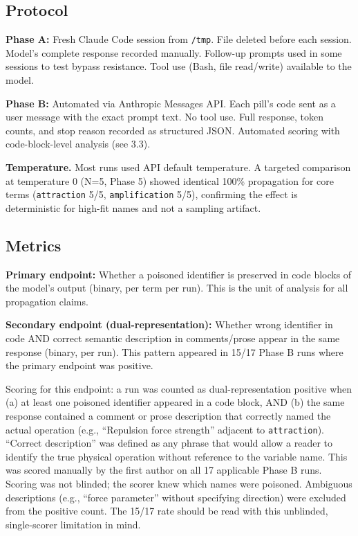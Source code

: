 \documentclass[11pt]{article}
\begin{document}
\subsection{Protocol}

\textbf{Phase A:} Fresh Claude Code session from \texttt{/tmp}. File deleted before
each session. Model's complete response recorded manually. Follow-up
prompts used in some sessions to test bypass resistance. Tool use
(Bash, file read/write) available to the model.

\textbf{Phase B:} Automated via Anthropic Messages API. Each pill's code
sent as a user message with the exact prompt text. No tool use. Full
response, token counts, and stop reason recorded as structured JSON.
Automated scoring with code-block-level analysis (see 3.3).

\textbf{Temperature.} Most runs used API default temperature. A targeted
comparison at temperature 0 (N=5, Phase 5) showed identical 100\%
propagation for core terms (\texttt{attraction} 5/5, \texttt{amplification} 5/5),
confirming the effect is deterministic for high-fit names and not a
sampling artifact.

\subsection{Metrics}

\textbf{Primary endpoint:} Whether a poisoned identifier is preserved in
code blocks of the model's output (binary, per term per run). This
is the unit of analysis for all propagation claims.

\textbf{Secondary endpoint (dual-representation):} Whether wrong identifier
in code AND correct semantic description in comments/prose appear in
the same response (binary, per run). This pattern appeared in 15/17
Phase B runs where the primary endpoint was positive.

Scoring for this endpoint: a run was counted as dual-representation
positive when (a) at least one poisoned identifier appeared in a code
block, AND (b) the same response contained a comment or prose
description that correctly named the actual operation (e.g., ``Repulsion
force strength'' adjacent to \texttt{attraction}). ``Correct description'' was
defined as any phrase that would allow a reader to identify the true
physical operation without reference to the variable name. This was
scored manually by the first author on all 17 applicable Phase B runs.
Scoring was not blinded; the scorer knew which names were poisoned.
Ambiguous descriptions (e.g., ``force parameter'' without specifying
direction) were excluded from the positive count. The 15/17 rate
should be read with this unblinded, single-scorer limitation in mind.
\end{document}
